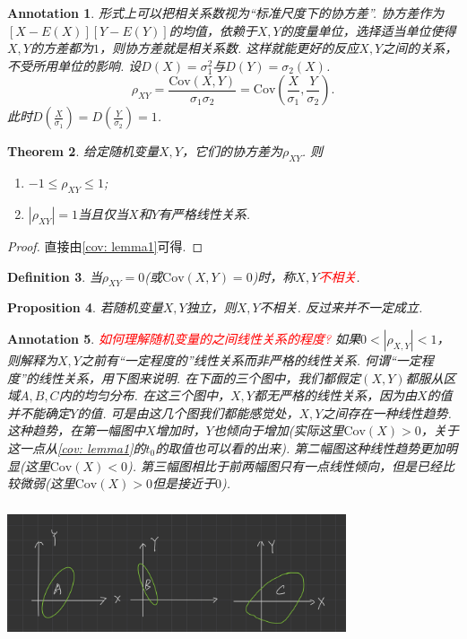 \documentclass{article}
\newtheorem{theorem}{Theorem}[section]
\newtheorem{proposition}[theorem]{Proposition}
\newtheorem{definition}[theorem]{Definition}
\newtheorem{annotation}[theorem]{Annotation}
\newcommand{\redt}[1]{\textcolor{red}{#1}}
\begin{document}
\begin{annotation}
\rm 形式上可以把相关系数视为“标准尺度下的协方差”. 协方差作为$[X-E(X)][Y-E(Y)]$的均值，依赖于$X,Y$的度量单位，选择适当单位使得$X,Y$的方差都为$1$，则协方差就是相关系数. 这样就能更好的反应$X,Y$之间的关系，不受所用单位的影响. 设$D(X)=\sigma_1^2$与$D(Y)=\sigma_2(X)$.
$$
\rho_{XY}=\frac{\text{Cov}(X,Y)}{\sigma_1\sigma_2} = \text{Cov}(\frac{X}{\sigma_1},\frac{Y}{\sigma_2}).
$$
此时$D(\frac{X}{\sigma_1})=D(\frac{Y}{\sigma_2}) = 1$.
\end{annotation}

\begin{theorem}
\rm 给定随机变量$X,Y$，它们的协方差为$\rho_{XY}$. 则
\begin{enumerate}
	\item $ -1 \leq \rho_{XY} \leq 1$;
	\item $|\rho_{XY}| = 1$当且仅当$X$和$Y$有严格线性关系. 
\end{enumerate} 
\end{theorem}

\begin{proof}
直接由\ref{cov: lemma1}可得.
\end{proof}

\begin{definition}
\rm 当$\rho_{XY}=0$(或$\text{Cov}(X,Y)=0$)时，称$X,Y$\redt{不相关}.
\end{definition}

\begin{proposition}
\rm 若随机变量$X,Y$独立，则$X,Y$不相关. 反过来并不一定成立. 
\end{proposition}

\begin{annotation}
\rm \redt{如何理解随机变量的之间线性关系的程度?} 如果$0 < |\rho_{X,Y}| < 1$，则解释为$X,Y$之前有“一定程度的”线性关系而非严格的线性关系. 何谓“一定程度”的线性关系，用下图来说明. 在下面的三个图中，我们都假定$(X,Y)$都服从区域$A,B,C$内的均匀分布. 在这三个图中，$X,Y$都无严格的线性关系，因为由$X$的值并不能确定$Y$的值. 可是由这几个图我们都能感觉处，$X,Y$之间存在一种线性趋势. 这种趋势，在第一幅图中$X$增加时，$Y$也倾向于增加(实际这里$\text{Cov}(X)>0$，关于这一点从\ref{cov: lemma1}的$t_0$的取值也可以看的出来). 第二幅图这种线性趋势更加明显(这里$\text{Cov}(X) < 0$). 第三幅图相比于前两幅图只有一点线性倾向，但是已经比较微弱(这里$\text{Cov}(X)>0$但是接近于$0$). 
\begin{center}
\includegraphics[width=10cm, height=4cm]{images/covariance.jpg}
\end{center}
\end{annotation}
\end{document}
